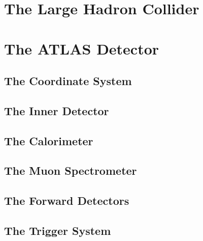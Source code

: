 \documentclass[10pt,twoside,cucitura,classica,openany]{toptesi}
\begin{document}
\section{The Large Hadron Collider}
\label{sec:large-hadr-coll}



\section{The ATLAS Detector}
\label{sec:atlas-detector}



\subsection{The Coordinate System}
\label{sec:coordinate-system}



\subsection{The Inner Detector}
\label{sec:inner-detector}



\subsection{The Calorimeter}
\label{sec:calorimeters}



\subsection{The Muon Spectrometer}
\label{sec:muon-spectrometer}



\subsection{The Forward Detectors}
\label{sec:forward-detectors}



\subsection{The Trigger System}
\label{sec:trigger-system}
\end{document}
